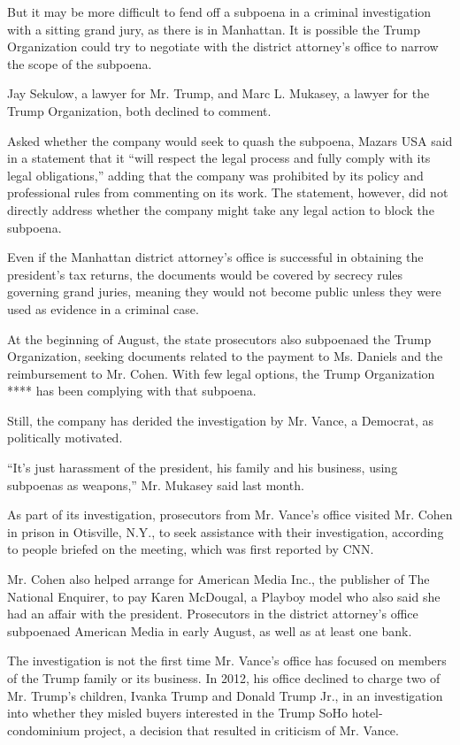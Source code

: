 But it may be more difficult to fend off a subpoena in a criminal
investigation with a sitting grand jury, as there is in Manhattan. It is
possible the Trump Organization could try to negotiate with the district
attorney's office to narrow the scope of the subpoena.

Jay Sekulow, a lawyer for Mr. Trump, and Marc L. Mukasey, a lawyer for
the Trump Organization, both declined to comment.

Asked whether the company would seek to quash the subpoena, Mazars USA
said in a statement that it ``will respect the legal process and fully
comply with its legal obligations,'' adding that the company was
prohibited by its policy and professional rules from commenting on its
work. The statement, however, did not directly address whether the
company might take any legal action to block the subpoena.

Even if the Manhattan district attorney's office is successful in
obtaining the president's tax returns, the documents would be covered by
secrecy rules governing grand juries, meaning they would not become
public unless they were used as evidence in a criminal case.

At the beginning of August, the state prosecutors also subpoenaed the
Trump Organization, seeking documents related to the payment to Ms.
Daniels and the reimbursement to Mr. Cohen. With few legal options, the
Trump Organization **** has been complying with that subpoena.

Still, the company has derided the investigation by Mr. Vance, a
Democrat, as politically motivated.

``It's just harassment of the president, his family and his business,
using subpoenas as weapons,'' Mr. Mukasey said last month.

As part of its investigation, prosecutors from Mr. Vance's office
visited Mr. Cohen in prison in Otisville, N.Y., to seek assistance with
their investigation, according to people briefed on the meeting, which
was first reported by CNN.

Mr. Cohen also helped arrange for American Media Inc., the publisher of
The National Enquirer, to pay Karen McDougal, a Playboy model who also
said she had an affair with the president. Prosecutors in the district
attorney's office subpoenaed American Media in early August, as well as
at least one bank.

The investigation is not the first time Mr. Vance's office has focused
on members of the Trump family or its business. In 2012, his office
declined to charge two of Mr. Trump's children, Ivanka Trump and Donald
Trump Jr., in an investigation into whether they misled buyers
interested in the Trump SoHo hotel-condominium project, a decision that
resulted in criticism of Mr. Vance.

